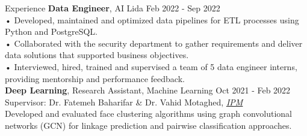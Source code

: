 \documentclass{resume} %
\begin{document}
\begin{rSection}{Experience}
{\bf Data Engineer}{, AI Lida} \hfill {Feb 2022 - Sep 2022}\\
• Developed, maintained and optimized data pipelines for ETL processes using Python and PostgreSQL.\\
• Collaborated with the security department to gather requirements and deliver data solutions that supported business objectives.\\
• Interviewed, hired, trained and supervised a team of 5 data engineer interns, providing mentorship and performance feedback.\\
{\bf Deep Learning}{, Research Assistant, Machine Learning \hfill { Oct 2021 - Feb 2022}\\ Supervisor: Dr. Fatemeh Baharifar \& Dr. Vahid Motaghed, \textit{\href{https://ipm.ac.ir/}{IPM}}}\\
Developed and evaluated face clustering algorithms using graph convolutional networks (GCN) for linkage prediction and pairwise classification approaches.

\end{rSection}



\end{document}
